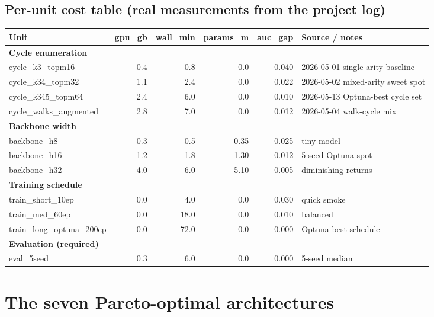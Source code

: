 \documentclass[11pt,a4paper]{article}
\begin{document}
\subsection{Per-unit cost table (real measurements from the project log)}

\begin{center}\footnotesize
\begin{tabular}{lrrrrl}
\toprule
Unit                          & gpu\_gb & wall\_min & params\_m & auc\_gap & Source / notes \\
\midrule
\textbf{Cycle enumeration} \\
\quad cycle\_k3\_topm16       & 0.4 & 0.8  & 0.0  & 0.040 & 2026-05-01 single-arity baseline \\
\quad cycle\_k34\_topm32      & 1.1 & 2.4  & 0.0  & 0.022 & 2026-05-02 mixed-arity sweet spot \\
\quad cycle\_k345\_topm64     & 2.4 & 6.0  & 0.0  & 0.010 & 2026-05-13 Optuna-best cycle set \\
\quad cycle\_walks\_augmented & 2.8 & 7.0  & 0.0  & 0.012 & 2026-05-04 walk-cycle mix \\
\textbf{Backbone width} \\
\quad backbone\_h8            & 0.3 & 0.5  & 0.35 & 0.025 & tiny model \\
\quad backbone\_h16           & 1.2 & 1.8  & 1.30 & 0.012 & 5-seed Optuna spot \\
\quad backbone\_h32           & 4.0 & 6.0  & 5.10 & 0.005 & diminishing returns \\
\textbf{Training schedule} \\
\quad train\_short\_10ep       & 0.0 & 4.0  & 0.0  & 0.030 & quick smoke \\
\quad train\_med\_60ep         & 0.0 & 18.0 & 0.0  & 0.010 & balanced \\
\quad train\_long\_optuna\_200ep & 0.0 & 72.0 & 0.0 & 0.000 & Optuna-best schedule \\
\textbf{Evaluation (required)} \\
\quad eval\_5seed             & 0.3 & 6.0  & 0.0  & 0.000 & 5-seed median \\
\bottomrule
\end{tabular}
\end{center}

\section{The seven Pareto-optimal architectures}
\end{document}
